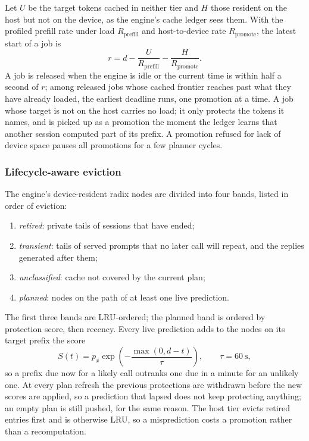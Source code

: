 Let $U$ be the target tokens cached in neither tier and $H$ those resident on the host but not on the device, as the engine's cache ledger sees them. With the profiled prefill rate under load $R_{\mathrm{prefill}}$ and host-to-device rate $R_{\mathrm{promote}}$, the latest start of a job is
\[
r=d-\frac{U}{R_{\mathrm{prefill}}}-\frac{H}{R_{\mathrm{promote}}}.
\]
A job is released when the engine is idle or the current time is within half a second of $r$; among released jobs whose cached frontier reaches past what they have already loaded, the earliest deadline runs, one promotion at a time. A job whose target is not on the host carries no load; it only protects the tokens it names, and is picked up as a promotion the moment the ledger learns that another session computed part of its prefix. A promotion refused for lack of device space pauses all promotions for a few planner cycles.

\subsubsection{Lifecycle-aware eviction}
The engine's device-resident radix nodes are divided into four bands, listed in order of eviction:
\begin{enumerate}
\item \emph{retired}: private tails of sessions that have ended;
\item \emph{transient}: tails of served prompts that no later call will repeat, and the replies generated after them;
\item \emph{unclassified}: cache not covered by the current plan;
\item \emph{planned}: nodes on the path of at least one live prediction.
\end{enumerate}
The first three bands are LRU-ordered; the planned band is ordered by protection score, then recency. Every live prediction adds to the nodes on its target prefix the score
\[
S(t)=p_x\exp\!\left(-\frac{\max(0,d-t)}{\tau}\right),\qquad\tau=60\ \text{s},
\]
so a prefix due now for a likely call outranks one due in a minute for an unlikely one. At every plan refresh the previous protections are withdrawn before the new scores are applied, so a prediction that lapsed does not keep protecting anything; an empty plan is still pushed, for the same reason. The host tier evicts retired entries first and is otherwise LRU, so a misprediction costs a promotion rather than a recomputation.

